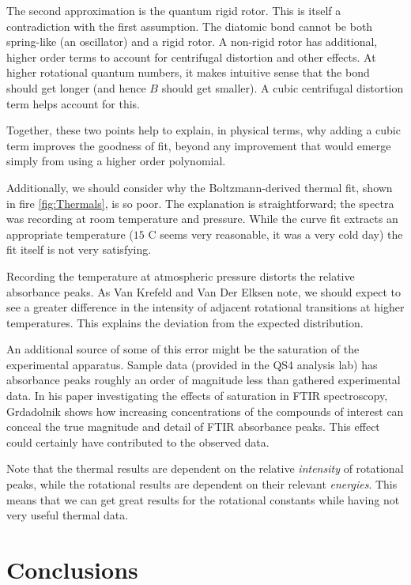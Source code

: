 \documentclass[aps,prl,reprint,10pt,amsmath,amssymb,superscriptaddress,a4paper]{revtex4-2}
\begin{document}
The second approximation is the quantum rigid rotor. This is itself a contradiction with the first assumption. The diatomic bond cannot be both spring-like (an oscillator) and a rigid rotor. A non-rigid rotor has additional, higher order terms to account for centrifugal distortion and other effects. At higher rotational quantum numbers, it makes intuitive sense that the bond should get longer (and hence $B$ should get smaller). A cubic centrifugal distortion term helps account for this.

Together, these two points help to explain, in physical terms, why adding a cubic term improves the goodness of fit, beyond any improvement that would emerge simply from using a higher order polynomial.

Additionally, we should consider why the Boltzmann-derived thermal fit, shown in fire \ref{fig:Thermals}, is so poor. The explanation is straightforward; the spectra was recording at room temperature and pressure. While the curve fit extracts an appropriate temperature ($15$ C seems very reasonable, it was a very cold day) the fit itself is not very satisfying. 

Recording the temperature at atmospheric pressure distorts the relative absorbance peaks. As Van Krefeld and Van Der Elksen note\cite{Pressure}, we should expect to see a greater difference in the intensity of adjacent rotational transitions at higher temperatures. This explains the deviation from the expected distribution.

An additional source of some of this error might be the saturation of the experimental apparatus. Sample data (provided in the QS4 analysis lab) has absorbance peaks roughly an order of magnitude less than gathered experimental data. In his paper investigating the effects of saturation in FTIR spectroscopy, Grdadolnik shows how increasing concentrations of the compounds of interest can conceal the true magnitude and detail of FTIR absorbance peaks\cite{Saturation}. This effect could certainly have contributed to the observed data.

Note that the thermal results are dependent on the relative {\it intensity} of rotational peaks, while the rotational results are dependent on their relevant {\it energies}. This means that we can get great results for the rotational constants while having not very useful thermal data.

\section{Conclusions}
\end{document}
